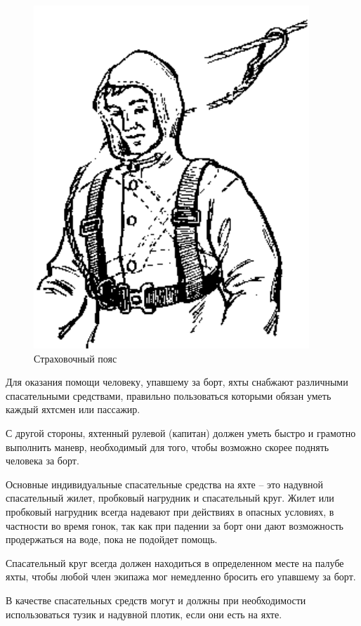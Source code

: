 \documentclass[a4paper, 12pt, twoside, final]{scrbook}
\begin{document}
\begin{figure}
	\centering
	\includegraphics[scale=1]{133_Strahovochnyj_pojas}
	\caption{Страховочный пояс}
	\label{fig:133}
\end{figure}

Для оказания помощи человеку, упавшему за борт, яхты снабжают различными спасательными средствами, правильно пользоваться которыми обязан уметь каждый яхтсмен или пассажир.

С другой стороны, яхтенный рулевой (капитан) должен уметь быстро и грамотно выполнить маневр, необходимый для того, чтобы возможно скорее поднять человека за борт.

Основные индивидуальные спасательные средства на яхте \--- это надувной спасательный жилет, пробковый нагрудник и спасательный круг. Жилет или пробковый нагрудник всегда надевают при действиях в опасных условиях, в частности во время гонок, так как при падении за борт они дают возможность продержаться на воде, пока не подойдет помощь.

Спасательный круг всегда должен находиться в определенном месте на палубе яхты, чтобы любой член экипажа мог немедленно бросить его упавшему за борт.

В качестве спасательных средств могут и должны при необходимости использоваться тузик и надувной плотик, если они есть на яхте.
\end{document}
